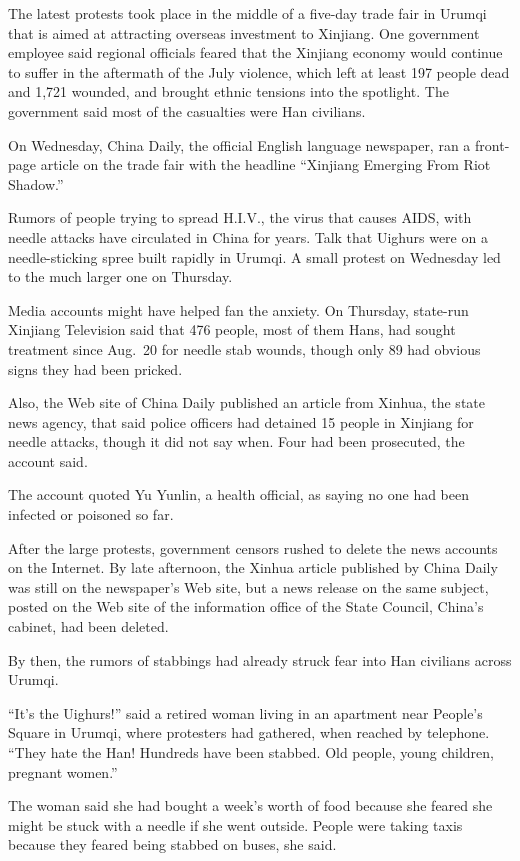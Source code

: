 ﻿\documentclass[12pt]{article}
\begin{document}
The latest protests took place in the middle of a five-day trade fair in Urumqi that is aimed at
attracting overseas investment to Xinjiang. One government employee said regional officials feared
that the Xinjiang economy would continue to suffer in the aftermath of the July violence, which left
at least 197 people dead and 1,721 wounded, and brought ethnic tensions into the spotlight. The
government said most of the casualties were Han civilians.

On Wednesday, China Daily, the official English language newspaper, ran a front-page article on the
trade fair with the headline ``Xinjiang Emerging From Riot Shadow.''

Rumors of people trying to spread H.I.V., the virus that causes AIDS, with needle attacks have
circulated in China for years. Talk that Uighurs were on a needle-sticking spree built rapidly in
Urumqi. A small protest on Wednesday led to the much larger one on Thursday.

Media accounts might have helped fan the anxiety. On Thursday, state-run Xinjiang Television said
that 476 people, most of them Hans, had sought treatment since Aug.~20 for needle stab wounds,
though only 89 had obvious signs they had been pricked.

Also, the Web site of China Daily published an article from Xinhua, the state news agency, that said
police officers had detained 15 people in Xinjiang for needle attacks, though it did not say when.
Four had been prosecuted, the account said.

The account quoted Yu Yunlin, a health official, as saying no one had been infected or poisoned so
far.

After the large protests, government censors rushed to delete the news accounts on the Internet. By
late afternoon, the Xinhua article published by China Daily was still on the newspaper's Web site,
but a news release on the same subject, posted on the Web site of the information office of the
State Council, China's cabinet, had been deleted.

By then, the rumors of stabbings had already struck fear into Han civilians across Urumqi.

``It's the Uighurs!'' said a retired woman living in an apartment near People's Square in Urumqi,
where protesters had gathered, when reached by telephone. ``They hate the Han! Hundreds have been
stabbed. Old people, young children, pregnant women.''

The woman said she had bought a week's worth of food because she feared she might be stuck with a
needle if she went outside. People were taking taxis because they feared being stabbed on buses, she
said.
\end{document}

